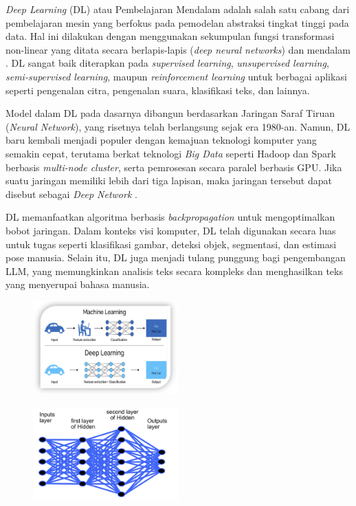 \textit{Deep Learning} (DL) atau Pembelajaran Mendalam adalah salah satu cabang dari pembelajaran mesin yang berfokus pada pemodelan abstraksi tingkat tinggi pada data. Hal ini dilakukan dengan menggunakan sekumpulan fungsi transformasi non-linear yang ditata secara berlapis-lapis (\textit{deep neural networks}) dan mendalam \cite{ahmad2017mengenal}. DL sangat baik diterapkan pada \textit{supervised learning}, \textit{unsupervised learning}, \textit{semi-supervised learning}, maupun \textit{reinforcement learning} untuk berbagai aplikasi seperti pengenalan citra, pengenalan suara, klasifikasi teks, dan lainnya.

Model dalam DL pada dasarnya dibangun berdasarkan Jaringan Saraf Tiruan (\textit{Neural Network}), yang risetnya telah berlangsung sejak era 1980-an. Namun, DL baru kembali menjadi populer dengan kemajuan teknologi komputer yang semakin cepat, terutama berkat teknologi \textit{Big Data} seperti Hadoop dan Spark berbasis \textit{multi-node cluster}, serta pemrosesan secara paralel berbasis GPU. Jika suatu jaringan memiliki lebih dari tiga lapisan, maka jaringan tersebut dapat disebut sebagai \textit{Deep Network} .

DL memanfaatkan algoritma berbasis \textit{backpropagation} untuk mengoptimalkan bobot jaringan. Dalam konteks visi komputer, DL telah digunakan secara luas untuk tugas seperti klasifikasi gambar, deteksi objek, segmentasi, dan estimasi pose manusia. Selain itu, DL juga menjadi tulang punggung bagi pengembangan LLM, yang memungkinkan analisis teks secara kompleks dan menghasilkan teks yang menyerupai bahasa manusia.



\begin{figure}[h!]
    \centering
    \includegraphics[width=0.5\textwidth]{images/deep_machine_diagram.png}
    \label{fig:ai_ml_dl_llm}
\end{figure}

\begin{figure}[h!]
    \centering
    \includegraphics[width=0.5\textwidth]{images/nn.png}
    \label{fig:nn_deeplearning}
\end{figure}


